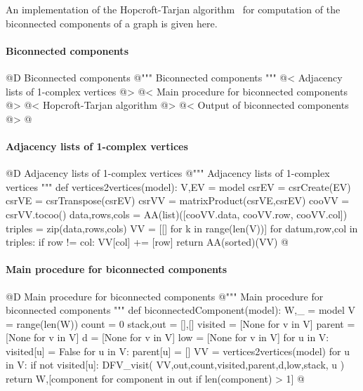 \documentclass[11pt,oneside]{article}    %
\begin{document}
An implementation of the Hopcroft-Tarjan algorithm~\cite{Hopcroft:1973:AEA:362248.362272} for computation of the biconnected components of a graph is given here.



\paragraph{Biconnected components}
@D Biconnected components
@{""" Biconnected components """
@< Adjacency lists of 1-complex vertices @>
@< Main procedure for biconnected components @>
@< Hopcroft-Tarjan algorithm @>
@< Output of biconnected components @>
@}



\paragraph{Adjacency lists of 1-complex vertices}
@D Adjacency lists of 1-complex vertices
@{""" Adjacency lists of 1-complex vertices """
def vertices2vertices(model):
    V,EV = model
    csrEV = csrCreate(EV)
    csrVE = csrTranspose(csrEV)
    csrVV = matrixProduct(csrVE,csrEV)    
    cooVV = csrVV.tocoo()
    data,rows,cols = AA(list)([cooVV.data, cooVV.row, cooVV.col])
    triples = zip(data,rows,cols)
    VV = [[] for k in range(len(V))]
    for datum,row,col in triples:
        if row != col: VV[col] += [row]
    return AA(sorted)(VV)
@}


\paragraph{Main procedure for biconnected components}
@D Main procedure for biconnected components
@{""" Main procedure for biconnected components """
def biconnectedComponent(model):
    W,_ = model
    V = range(len(W))
    count = 0
    stack,out = [],[]
    visited = [None for v in V]
    parent = [None for v in V]
    d = [None for v in V]
    low = [None for v in V]
    for u in V: visited[u] = False
    for u in V: parent[u] = []
    VV = vertices2vertices(model)
    for u in V: 
        if not visited[u]: 
            DFV_visit( VV,out,count,visited,parent,d,low,stack, u )
    return W,[component for component in out if len(component) > 1]
@}
\end{document}
